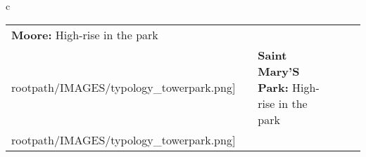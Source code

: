 \begin{table}[H]
        \begin{tabular}{c}
        \begin{tabular}{m{1.25in} m{2in} m{.1in} m{1.25in} m{2in}}
\textbf{Moore:} {High-rise in the park} & \texttt{[image: \\rootpath/IMAGES/typology\_towerpark.png]} & & \textbf{Saint Mary'S Park:} {High-rise in the park} & \texttt{[image: \\rootpath/IMAGES/typology\_towerpark.png]}
\end{tabular}\end{tabular}
        \end{table}
